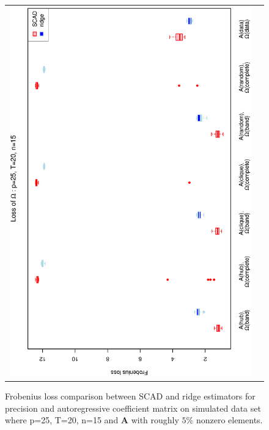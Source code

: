 \begin{figure}[h!]
\begin{tabular}{cc}
\includegraphics[scale=0.45,angle=270]{LossOmega25T20N15_5.eps}
\end{tabular}
\caption{Frobenius loss comparison between SCAD and ridge estimators for precision and autoregressive coefficient matrix on simulated data set where p=25, T=20, n=15  and $\mathbf{A}$ with roughly $5\%$ nonzero elements.}
\label{figSM:Loss25T20N15_5}
\end{figure}


